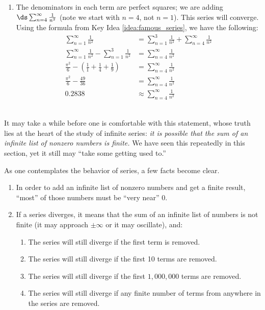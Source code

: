 {\begin{enumerate}
\item		The denominators in each term are perfect squares; we are adding $\ds \sum_{n=4}^\infty \frac{1}{n^2}$ (note  we start with $n=4$, not $n=1$). This series will converge. Using the formula from Key Idea \ref{idea:famous_series}, we have the following:
\begin{align*}
\sum_{n=1}^\infty \frac1{n^2} &= \sum_{n=1}^3 \frac1{n^2} +\sum_{n=4}^\infty \frac1{n^2} \\
\sum_{n=1}^\infty \frac1{n^2} - \sum_{n=1}^3 \frac1{n^2} &=\sum_{n=4}^\infty \frac1{n^2} \\
\frac{\pi^2}{6} - \left(\frac11+\frac14+\frac19\right) &= \sum_{n=4}^\infty \frac1{n^2} \\
\frac{\pi^2}{6} - \frac{49}{36} &= \sum_{n=4}^\infty \frac1{n^2} \\
0.2838&\approx \sum_{n=4}^\infty \frac1{n^2} 
\end{align*}
\end{enumerate}
\baselineskip
}\\

It may take a while before one is comfortable with this statement, whose truth lies at the heart of the study of infinite series: \emph{it is possible that the sum of an infinite list of nonzero numbers is finite.} We have seen this repeatedly in this section, yet it still may ``take some getting used to.''

As one contemplates the behavior of series, a few facts become clear. 
\begin{enumerate}
\item		In order to add an infinite list of nonzero numbers and get a finite result, ``most'' of those numbers must be ``very near'' 0. 
\item		If a series diverges, it means that the sum of an infinite list of numbers is not finite (it may approach $\pm \infty$ or it may oscillate), and:
		\begin{enumerate}
		\item		The series will still diverge if the first term is removed.
		\item		The series will still diverge if the first 10 terms are removed.
		\item		The series will still diverge if the first $1,000,000$ terms are removed.
		\item		The series will still diverge if any finite number of terms from anywhere in the series are removed.
		\end{enumerate}
\end{enumerate}

